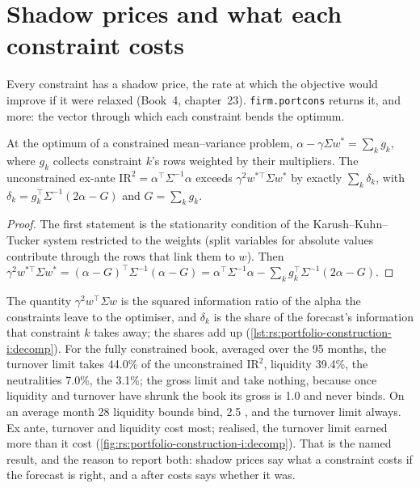 \section{Shadow prices and what each constraint costs}

Every constraint has a shadow price, the rate at which the objective would improve if it were relaxed (Book~4, chapter~23). \texttt{firm.portcons} returns it, and
more: the vector through which each constraint bends the optimum.

\begin{proposition}\label{prop:rs:portfolio-construction-i:decomp}
At the optimum of a constrained mean--variance problem, $\alpha - \gamma\Sigma w^* = \sum_k g_k$, where $g_k$ collects constraint $k$'s rows weighted by their
multipliers. The unconstrained ex-ante $\mathrm{IR}^2 = \alpha^\top\Sigma^{-1}\alpha$ exceeds $\gamma^2 w^{*\top}\Sigma w^*$ by exactly $\sum_k \delta_k$, with
$\delta_k = g_k^\top\Sigma^{-1}(2\alpha - G)$ and $G = \sum_k g_k$.
\end{proposition}

\begin{proof}
The first statement is the stationarity condition of the Karush--Kuhn--Tucker system restricted to the weights (split variables for absolute values contribute
through the rows that link them to $w$). Then $\gamma^2 w^{*\top}\Sigma w^* = (\alpha - G)^\top\Sigma^{-1}(\alpha - G) = \alpha^\top\Sigma^{-1}\alpha - \sum_k
g_k^\top\Sigma^{-1}(2\alpha - G)$.
\end{proof}

The quantity $\gamma^2 w^\top\Sigma w$ is the squared information ratio of the alpha the constraints leave to the optimiser, and $\delta_k$ is the share of the
forecast's information that constraint $k$ takes away; the shares add up (\cref{lst:rs:portfolio-construction-i:decomp}). For the fully constrained book,
averaged over the 95 months, the turnover limit takes 44.0\% of the unconstrained $\mathrm{IR}^2$, liquidity 39.4\%, the neutralities 7.0\%, the  3.1\%;
the gross limit and  take nothing, because once liquidity and turnover have shrunk the book its gross is 1.0 and never binds. On an average month
28 liquidity bounds bind, 2.5 , and the turnover limit always. Ex ante, turnover and liquidity cost most; realised, the turnover limit earned more than it
cost (\cref{fig:rs:portfolio-construction-i:decomp}). That is the named result, and the reason to report both: shadow prices say what a constraint costs if the
forecast is right, and a  after costs says whether it was.

